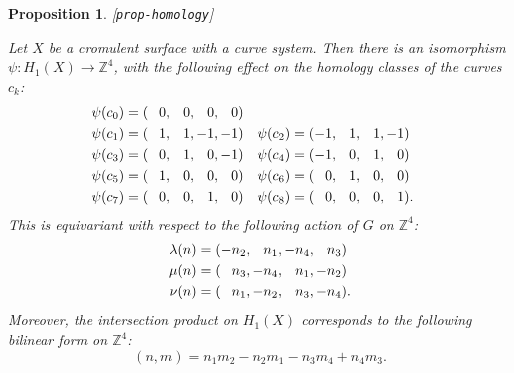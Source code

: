 \documentclass[reqno]{amsart}
\newcommand{\lbl}[1]{\label{#1}\textup{[\texttt{#1}]}\par}
\newcommand{\lbl}{\label}
\newcommand{\lm}        {\lambda}
\newcommand{\Z}         {{\mathbb{Z}}}
\newcommand{\pp}        {\hphantom{+}}
\renewcommand{\:}{\colon}
\newtheorem{proposition}[theorem]{Proposition}
\theoremstyle{definition}
\begin{document}
\begin{proposition}\lbl{prop-homology}
 Let $X$ be a cromulent surface with a curve system.  Then there is an
 isomorphism $\psi\:H_1(X)\to\Z^4$, with the following effect on the
 homology classes of the curves $c_k$:
 \begin{align*}
  \psi(c_{ 0}) &= (\pp 0,\pp 0,\pp 0,\pp 0) \\
  \psi(c_{ 1}) &= (\pp 1,\pp 1,   -1,   -1) &
  \psi(c_{ 2}) &= (   -1,\pp 1,\pp 1,   -1) \\
  \psi(c_{ 3}) &= (\pp 0,\pp 1,\pp 0,   -1) &
  \psi(c_{ 4}) &= (   -1,\pp 0,\pp 1,\pp 0) \\
  \psi(c_{ 5}) &= (\pp 1,\pp 0,\pp 0,\pp 0) &
  \psi(c_{ 6}) &= (\pp 0,\pp 1,\pp 0,\pp 0) \\
  \psi(c_{ 7}) &= (\pp 0,\pp 0,\pp 1,\pp 0) &
  \psi(c_{ 8}) &= (\pp 0,\pp 0,\pp 0,\pp 1).
 \end{align*}
 This is equivariant with respect to the following action of $G$ on
 $\Z^4$:
 \begin{align*}
  \lm(n) &= (   -n_2,\pp n_1,   -n_4,\pp n_3) \\
  \mu(n) &= (\pp n_3,   -n_4,\pp n_1,   -n_2) \\
  \nu(n) &= (\pp n_1,   -n_2,\pp n_3,   -n_4).
 \end{align*}
 Moreover, the intersection product on $H_1(X)$ corresponds to the
 following bilinear form on $\Z^4$:
 \[ (n,m) = n_1m_2 - n_2m_1 - n_3m_4 + n_4m_3. \]
\end{proposition}
\end{document}
